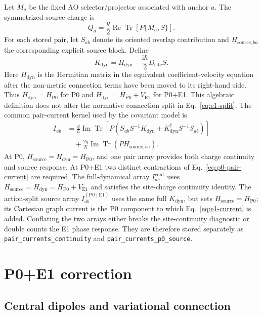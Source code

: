 \documentclass[11pt]{article}
\newcommand{\ii}{\mathrm{i}}
\newcommand{\Pzero}{\mathrm{P0}}
\newcommand{\Eone}{\mathrm{E1}}
\newcommand{\ReTr}{\operatorname{Re}\operatorname{Tr}}
\newcommand{\ImTr}{\operatorname{Im}\operatorname{Tr}}
\newcommand{\code}[1]{\texttt{#1}}
\begin{document}
Let \(M_a\) be the fixed AO selector/projector associated with anchor
\(a\). The symmetrized source charge is
\begin{equation}
 Q_a=\frac q2\ReTr\!\left[P\{M_a,S\}\right].
 \label{eq:site-charge}
\end{equation}
For each stored pair, let \(S_{ab}\) denote its oriented overlap contribution
and \(H_{\mathrm{source},ba}\) the corresponding explicit source block.
Define
\begin{equation}
 K_{\mathrm{dyn}}
 =H_{\mathrm{dyn}}-\frac{\ii\hbar}{2}D_{\mathrm{site}}S.
\end{equation}
Here \(H_{\mathrm{dyn}}\) is the Hermitian matrix in the equivalent
coefficient-velocity equation after the non-metric connection terms have been
moved to its right-hand side. Thus \(H_{\mathrm{dyn}}=H_{\Pzero}\) for P0 and
\(H_{\mathrm{dyn}}=H_{\Pzero}+V_{\Eone}\) for P0+E1. This algebraic definition
does not alter the normative connection split in Eq.~\eqref{eq:e1-split}.
The common pair-current kernel used by the covariant model is
\begin{align}
 I_{ab}
 &=\frac q\hbar\ImTr\!\left[
 P\left(
 S_{ab}S^{-1}K_{\mathrm{dyn}}
 +K_{\mathrm{dyn}}^\dagger S^{-1}S_{ab}
 \right)\right]\nonumber\\
 &\quad
 +\frac{2q}{\hbar}\ImTr\!\left(PH_{\mathrm{source},ba}\right).
 \label{eq:p0-pair-current}
\end{align}
At P0, \(H_{\mathrm{source}}=H_{\mathrm{dyn}}=H_{\Pzero}\), and one pair
array provides both charge continuity and source response. At P0+E1 two
distinct contractions of Eq.~\eqref{eq:p0-pair-current} are required. The
full-dynamical array \(I_{ab}^{\mathrm{cont}}\) uses
\(H_{\mathrm{source}}=H_{\mathrm{dyn}}=H_{\Pzero}+V_{\Eone}\) and satisfies
the site-charge continuity identity. The action-split source array
\(I_{ab}^{(\Pzero\mid\Eone)}\) uses the same full \(K_{\mathrm{dyn}}\), but
sets \(H_{\mathrm{source}}=H_{\Pzero}\); its Cartesian graph current is the
P0 component to which Eq.~\eqref{eq:e1-current} is added. Conflating the two
arrays either breaks the site-continuity diagnostic or double counts the E1
phase response. They are therefore stored separately as
\code{pair\_currents\_continuity} and
\code{pair\_currents\_p0\_source}.

\section{P0+E1 correction}

\subsection{Central dipoles and variational connection}
\end{document}
